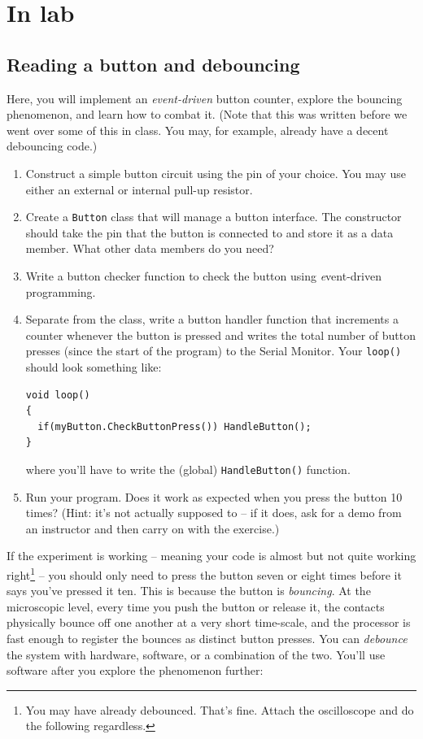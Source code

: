 \documentclass[11pt]{article} %
\begin{document}
\section*{In lab}

\subsection*{Reading a button and debouncing}

Here, you will implement an \emph{event-driven} button counter, explore the bouncing phenomenon, and learn how to combat it. (Note that this was written before we went over some of this in class. You may, for example, already have a decent debouncing code.)

\begin{enumerate}
\item Construct a simple button circuit using the pin of your choice. You may use either an external or internal pull-up resistor.
\item Create a \verb|Button| class that will manage a button interface. The constructor should take the pin that the button is connected to and store it as a data member. What other data members do you need?
\item Write a button checker function to check the button using {\emph event-driven} programming.
\item Separate from the class, write a button handler function that increments a counter whenever the button is pressed and writes the total number of button presses (since the start of the program) to the Serial Monitor. Your \verb|loop()| should look something like:
\begin{verbatim}
void loop()
{
  if(myButton.CheckButtonPress()) HandleButton();
}
\end{verbatim}
where you’ll have to write the (global) \verb|HandleButton()| function.
\item Run your program. Does it work as expected when you press the button 10 times? (Hint: it’s not actually supposed to -- if it does, ask for a demo from an instructor and then carry on with the exercise.)
\end{enumerate}

If the experiment is working -- meaning your code is almost but not quite working right\footnote{You may have already debounced. That’s fine. Attach the oscilloscope and do the following regardless.} -- you should only need to press the button seven or eight times before it says you’ve pressed it ten. This is because the button is \emph{bouncing}. At the microscopic level, every time you push the button or release it, the contacts physically bounce off one another at a very short time-scale, and the processor is fast enough to register the bounces as distinct button presses. You can \emph{debounce} the system with hardware, software, or a combination of the two. You’ll use software after you explore the phenomenon further:
\end{document}
